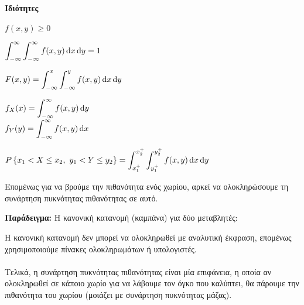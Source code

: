 \documentclass[11pt,a4paper,notitlepage,fleqn,final]{article}
\begin{document}
	\paragraph{Ιδιότητες}
	\begin{enumroman}
		\item \( f(x,y) \geq 0 \)
		\item \( \displaystyle
		\int_{-\infty}^{\infty} \int_{-\infty}^{\infty} f(x,y)\mathop{}\!\mathrm{d} x
		\mathop{}\!\mathrm{d} y = 1
		 \)
		\item \( \displaystyle
		F(x,y) = \int_{-\infty}^{x}\int_{-\infty}^{y} f(x,y)\mathop{}\!\mathrm{d} x\mathop{}\!\mathrm{d} y
		 \)
		\item \( \displaystyle
		f_X(x) = \int_{-\infty}^{\infty} f(x,y)\mathop{}\!\mathrm{d} y \) \\
		\( \displaystyle
		f_Y(y) = \int_{-\infty}^{\infty} f(x,y)\mathop{}\!\mathrm{d} x \)
		\item \( \displaystyle
		P\left\lbrace x_1<X\leq x_2,\ y_1<Y\leq y_2 \right\rbrace
		= \int_{x_1^+}^{x_2^+} \int_{y_1^+}^{y_2^+} f(x,y)\mathop{}\!\mathrm{d} x\mathop{}\!\mathrm{d} y
		 \)
	\end{enumroman}

	Επομένως για να βρούμε την πιθανότητα ενός χωρίου, αρκεί να
	ολοκληρώσουμε τη συνάρτηση πυκνότητας πιθανότητας σε αυτό.

	\textbf{Παράδειγμα:} Η κανονική κατανομή (καμπάνα)
	για δύο μεταβλητές:


	Η κανονική κατανομή δεν μπορεί να ολοκληρωθεί με αναλυτική έκφραση,
	επομένως χρησιμοποιούμε πίνακες ολοκληρωμάτων ή υπολογιστές.

	\paragraph{}
	Τελικά, η συνάρτηση πυκνότητας πιθανότητας είναι μία επιφάνεια,
	η οποία αν ολοκληρωθεί σε κάποιο χωρίο για να λάβουμε τον όγκο που
	καλύπτει, θα πάρουμε την πιθανότητα του χωρίου (μοιάζει με συνάρτηση
	πυκνότητας μάζας).
\end{document}
